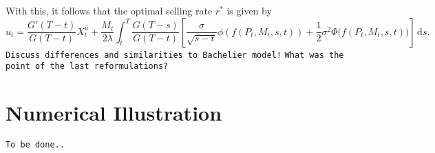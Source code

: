 \documentclass[11pt]{article}
\theoremstyle{definition}
\theoremstyle{remark}
\newcommand{\ts}{\textstyle}
\newcommand{\de}{\,\mathrm{d}}
\begin{document}
With this, it follows that the optimal selling rate $r^*$ is given by
\[
 \hat{u}_t = \frac{G'(T-t)}{G(T-t)} X^{\hat{u}}_t + \frac{M_t}{2\lambda}\int_t^T  \frac{G(T-s)}{G(T-t)} \left[ \frac{\sigma}{\sqrt{s-t}}\phi\left(f(P_t,M_t,s,t)\right)+\frac{1}{2}\sigma^2 \Phi\bigl(f(P_t,M_t,s,t)\bigr)\right] \de s.
\]
\texttt{Discuss differences and similarities to Bachelier model!}
\texttt{What was the point of the last reformulations?}

\section{Numerical Illustration}

\texttt{To be done..}

\end{document}
